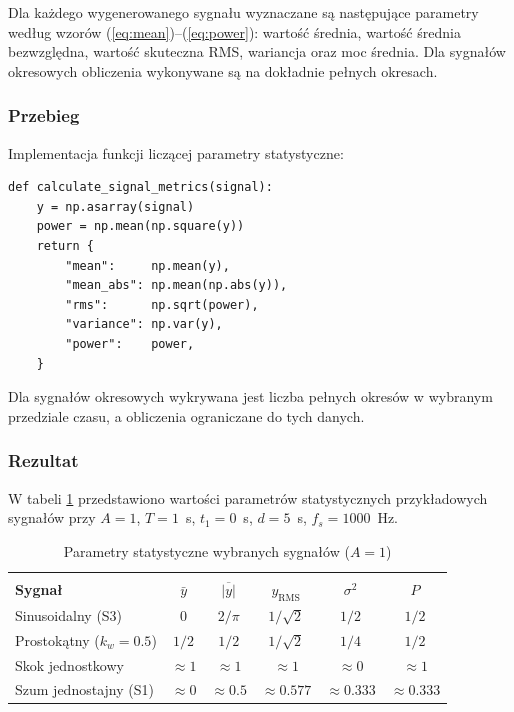 \documentclass[12pt]{article}
\begin{document}
Dla każdego wygenerowanego sygnału wyznaczane są następujące
parametry według wzorów (\ref{eq:mean})--(\ref{eq:power}): wartość
średnia, wartość średnia bezwzględna, wartość skuteczna RMS,
wariancja oraz moc średnia. Dla sygnałów okresowych obliczenia
wykonywane są na dokładnie pełnych okresach.

\subsubsection{Przebieg}

Implementacja funkcji liczącej parametry statystyczne:

\begin{lstlisting}
def calculate_signal_metrics(signal):
    y = np.asarray(signal)
    power = np.mean(np.square(y))
    return {
        "mean":     np.mean(y),
        "mean_abs": np.mean(np.abs(y)),
        "rms":      np.sqrt(power),
        "variance": np.var(y),
        "power":    power,
    }
\end{lstlisting}

Dla sygnałów okresowych wykrywana jest liczba pełnych okresów
w wybranym przedziale czasu, a obliczenia ograniczane do tych danych.

\subsubsection{Rezultat}

W tabeli \ref{tab:statystyki} przedstawiono wartości parametrów
statystycznych przykładowych sygnałów przy $A=1$, $T=1$~s,
$t_1=0$~s, $d=5$~s, $f_s=1000$~Hz.

\begin{table}[h!]
  \caption{Parametry statystyczne wybranych sygnałów ($A=1$)}
  \centering
  \vspace{0.2cm}
  \begin{tabular}{l c c c c c}
    \hline\hline\\[-0.4cm]
    \textbf{Sygnał} & $\bar{y}$ & $\overline{|y|}$ &
    $y_{\mathrm{RMS}}$ & $\sigma^2$ & $P$ \\[0.1cm]
    \hline
    Sinusoidalny (S3)          & $0$    & $2/\pi$       & $1/\sqrt{2}$ & $1/2$ & $1/2$ \\
    Prostokątny ($k_w=0.5$)& $1/2$  & $1/2$         & $1/\sqrt{2}$ & $1/4$ & $1/2$ \\
    Skok jednostkowy           & $\approx\!1$ & $\approx\!1$ & $\approx\!1$ & $\approx\!0$ & $\approx\!1$ \\
    Szum jednostajny (S1)      & $\approx\!0$ & $\approx\!0.5$ & $\approx\!0.577$ & $\approx\!0.333$ & $\approx\!0.333$ \\[0.1cm]
    \hline
  \end{tabular}
  \label{tab:statystyki}
\end{table}
\end{document}
